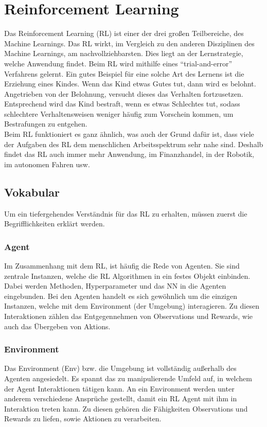 \section{Reinforcement Learning} \label{sec:Grundlagen_RL}
Das Reinforcement Learning (RL) ist einer der drei großen Teilbereiche, des Machine Learnings.
Das RL wirkt, im Vergleich zu den anderen Disziplinen des Machine Learnings, am nachvollziehbarsten.
Dies liegt an der Lernstrategie, welche Anwendung findet. 
Beim RL wird mithilfe eines "`trial-and-error"' Verfahrens gelernt. Ein gutes Beispiel für eine solche Art des Lernens ist die Erziehung eines Kindes. Wenn das Kind etwas Gutes tut, dann wird es belohnt. Angetrieben von der Belohnung, versucht dieses das Verhalten fortzusetzen. 
Entsprechend wird das Kind bestraft, wenn es etwas Schlechtes tut, sodass schlechtere Verhaltensweisen weniger häufig zum Vorschein kommen, um Bestrafungen zu entgehen. \citep[S.1 ff.]{Sutton1998}\\
Beim RL funktioniert es ganz ähnlich, was auch der Grund dafür ist, dass viele der Aufgaben des RL dem menschlichen Arbeitsspektrum sehr nahe sind. 
Deshalb findet das RL auch immer mehr Anwendung, im Finanzhandel, in der Robotik, im autonomen Fahren usw. \citep[Kapitel 18]{DRL_Lapan}

\subsection{Vokabular} \label{subsec:Grundlagen_Vokabular}
Um ein tiefergehendes Verständnis für das RL zu erhalten, müssen zuerst die Begrifflichkeiten erklärt werden.

\subsubsection{Agent} \label{subsubsec:Grundlagen_Agent}
Im Zusammenhang mit dem RL, ist häufig die Rede von Agenten. Sie sind zentrale Instanzen, welche die RL Algorithmen in ein festes Objekt einbinden. Dabei werden Methoden, Hyperparameter und das NN in die Agenten eingebunden. \citep[S. 31]{DRL_Lapan}
Bei den Agenten handelt es sich gewöhnlich um die einzigen Instanzen, welche mit dem Environment (der Umgebung) interagieren. Zu diesen Interaktionen zählen das Entgegennehmen von Observations und Rewards, wie auch das Übergeben von Aktions. \citep[S. 2ff.]{Sutton1998}

\subsubsection{Environment} \label{subsubsec:Grundlagen_Environment}
Das Environment (Env) bzw. die  Umgebung ist vollständig außerhalb des Agenten angesiedelt. Es spannt das zu manipulierende Umfeld auf, in welchem der Agent Interaktionen tätigen kann. An ein Environment werden unter anderem verschiedene Ansprüche gestellt, damit ein RL Agent mit ihm in Interaktion treten kann. Zu diesen gehören die Fähigkeiten Observations und Rewards zu liefen, sowie Aktionen zu verarbeiten. \citep[S. 31 \& S.2 ff.]{DRL_Lapan, Sutton1998}

